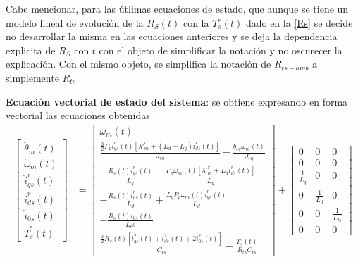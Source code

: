 \documentclass[a4paper, 10pt, onecolumn,journal]{ieeeconf}
\begin{document}
Cabe mencionar, para las útlimas ecuaciones de estado, que aunque se tiene un modelo lineal de evolución de la $R_S(t)$ con la $T^\circ_s(t)$ dado en la \cref{Rs}
se decide no desarrollar la misma en las ecuaciones anteriores y se deja la dependencia explicita de $R_S$ con $t$ con el objeto de simplificar la notación
y no oscurecer la explicación. Con el mismo objeto, se simplifica la notación de $R_{ts-amb}$ a simplemente $R_{ts}$

\textbf{Ecuación vectorial de estado del sistema}: se obtiene expresando en forma vectorial las ecuaciones obtenidas
\begin{equation}
    \begin{aligned}
        \begin{bmatrix} 
        \dot{\theta}_m(t) \\ 
        \dot{\omega}_m(t) \\ 
        \dot{i}^r_{qs}(t) \\ 
        \dot{i}^r_{ds}(t) \\ 
        \dot{i}_{0s}(t) \\ 
        \dot{T}^\circ_s(t) 
        \end{bmatrix} 
        &= 
        \begin{bmatrix} 
        \omega_m(t) \\ 
        \frac{\frac{3}{2} P_p i^r_{qs}(t)\left[\lambda'^r_m + (L_d - L_q) i^r_{ds}(t) \right]}{J_{eq}} - \frac{b_{eq}\omega_m(t)}{J_{eq}} \\ 
        -\frac{R_s(t) i^r_{qs}(t)}{L_q} - \frac{P_p \omega_m(t) \left[\lambda'^r_m + L_d i^r_{ds}(t)\right]}{L_q}\\ 
        -\frac{R_s(t) i^r_{ds}(t)}{L_d} + \frac{L_q P_p \omega_m(t) i^r_{qs}(t)}{L_d}  \\ 
        -\frac{R_s(t) i_{0s}(t) }{L_ls} \\ 
        \frac{\frac{3}{2} R_s(t) \left[ i_{qs}^2(t) + i_{ds}^2(t) + 2 i_{0s}^2(t) \right]}{C_{ts}} - \frac{T_s^{\circ}(t)}{R_{ts}C_{ts}}
        \end{bmatrix}
        + 
        \begin{bmatrix} 
        0 & 0 & 0 \\ 
        0 & 0 & 0 \\ 
        \frac{1}{L_q} & 0 & 0 \\ 
        0 & \frac{1}{L_d} & 0  \\ 
        0 & 0 & \frac{1}{L_{ls}}  \\ 
        0 & 0 & 0
        \end{bmatrix} 

\end{aligned}
\end{equation}
\end{document}
